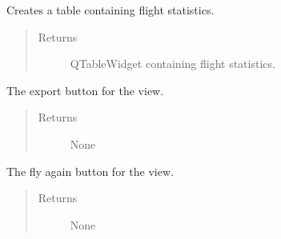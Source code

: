 \documentclass[letterpaper,10pt,english]{sphinxmanual}
\begin{document}
\begin{fulllineitems}

\begin{fulllineitems}
\label{\detokenize{index:src.Views.View_ReportScreen.ReportWindow.createStatisticsTable}}
Creates a table containing flight statistics.
\begin{quote}\begin{description}
\item[{Returns}] \leavevmode
QTableWidget containing flight statistics.

\end{description}\end{quote}

\end{fulllineitems}


\begin{fulllineitems}
\label{\detokenize{index:src.Views.View_ReportScreen.ReportWindow.del_BtnExport}}
The export button for the view.
\begin{quote}\begin{description}
\item[{Returns}] \leavevmode
None

\end{description}\end{quote}

\end{fulllineitems}


\begin{fulllineitems}
\label{\detokenize{index:src.Views.View_ReportScreen.ReportWindow.del_BtnFlyAgain}}
The fly again button for the view.
\begin{quote}\begin{description}
\item[{Returns}] \leavevmode
None


\end{description}
\end{quote}
\end{fulllineitems}
\end{fulllineitems}
\end{document}
